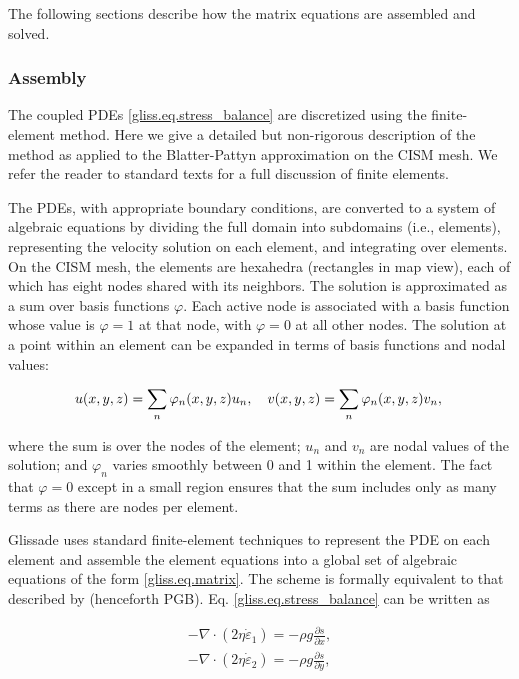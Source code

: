 The following sections describe how the matrix equations are assembled and solved. 

\subsubsection{Assembly}
\label{sec:glissade-assembly}
The coupled PDEs \eqref{gliss.eq.stress_balance} are discretized using the finite-element method.
Here we give a detailed but non-rigorous description of the method as applied to the Blatter-Pattyn
approximation on the CISM mesh.
We refer the reader to standard texts \citep[e.g.,][]{Hughes2000,Huebner2001} for a full discussion of finite elements.

The PDEs, with appropriate boundary conditions, are converted to a system of algebraic equations
by dividing the full domain into subdomains (i.e., elements), representing the velocity solution on each element,
and integrating over elements. On the CISM mesh, the elements are hexahedra (rectangles
in map view), each of which has eight nodes shared with its neighbors.
The solution is approximated as a sum over basis functions $\varphi$. 
Each active node is associated with a basis function whose value is $\varphi = 1$ at that node,
with $\varphi = 0$ at all other nodes. The solution at a point
within an element can be expanded in terms of basis functions and nodal values:

\begin{equation}
\label{gliss.eq.velo_expansion}  
   u(x,y,z) = \sum\limits_{n}{{{\varphi }_{n}(x,y,z)}{{u}_{n}}}, \quad 
   v(x,y,z) = \sum\limits_{n}{{{\varphi }_{n}(x,y,z)}{{v}_{n}}},  \\
\end{equation}

\noindent
where the sum is over the nodes of the element; $u_n$ and $v_n$ are nodal
values of the solution; and $\varphi_n$ varies smoothly between 0 and 1 within the element.
The fact that $\varphi = 0$ except in a small region ensures that the sum includes only
as many terms as there are nodes per element.

Glissade uses standard finite-element techniques to represent the PDE on each element and assemble
the element equations into a global set of algebraic equations of the form \eqref{gliss.eq.matrix}.
The scheme is formally equivalent to that described by \citet{Perego2012} (henceforth PGB).
Eq. \eqref{gliss.eq.stress_balance} can be written as

\begin{equation}
  \label{gliss.eq.Perego12}
  \begin{split}
    -\nabla \cdot (2\eta {{{\dot{\varepsilon }}}_{1}}) = -\rho g\frac{\partial s}{\partial x}, \\
    -\nabla \cdot (2\eta {{{\dot{\varepsilon }}}_{2}}) = -\rho g\frac{\partial s}{\partial y}, \\
  \end{split}
\end{equation}

